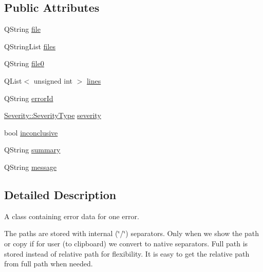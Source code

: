 \subsection*{Public Attributes}
\begin{DoxyCompactItemize}
\item 
Q\-String \hyperlink{class_error_item_a7ef5bfcb23db4b9ee239cb23a51dbe3c}{file}
\item 
Q\-String\-List \hyperlink{class_error_item_a6ceb9b47326884878a038c1bc1df710d}{files}
\item 
Q\-String \hyperlink{class_error_item_a37601c0b1e90e2837ef6600180640868}{file0}
\item 
Q\-List$<$ unsigned int $>$ \hyperlink{class_error_item_aabd883de1cdd1cd394077ecdc67d171e}{lines}
\item 
Q\-String \hyperlink{class_error_item_aff1725eaf4ca3d7ce627a451b38b712a}{error\-Id}
\item 
\hyperlink{class_severity_ac185938ae084355bbf1790cf1a70caa6}{Severity\-::\-Severity\-Type} \hyperlink{class_error_item_aa5956cbcf0447d41e5d7db2ba1954e6f}{severity}
\item 
bool \hyperlink{class_error_item_a24f122bf960197ac9ed5c1106f08f6f4}{inconclusive}
\item 
Q\-String \hyperlink{class_error_item_a662817b060de330c8a038538ac25d946}{summary}
\item 
Q\-String \hyperlink{class_error_item_ab549a8c75af7766413648798f0ae0383}{message}
\end{DoxyCompactItemize}


\subsection{Detailed Description}
A class containing error data for one error. 

The paths are stored with internal (\char`\"{}/\char`\"{}) separators. Only when we show the path or copy if for user (to clipboard) we convert to native separators. Full path is stored instead of relative path for flexibility. It is easy to get the relative path from full path when needed. 

